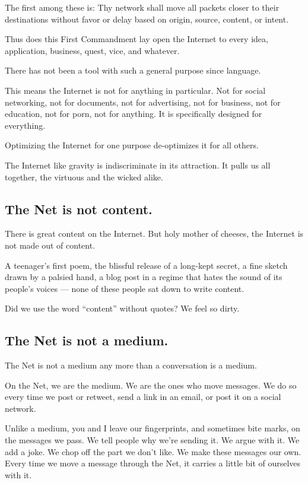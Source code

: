 \documentclass[letterpaper,12pt,english]{sphinxmanual}
\begin{document}
The first among these is: Thy network shall move all packets closer to their destinations without favor or delay based on origin, source, content, or intent.

Thus does this First Commandment lay open the Internet to every idea, application, business, quest, vice, and whatever.

There has not been a tool with such a general purpose since language.

This means the Internet is not for anything in particular. Not for social networking, not for documents, not for advertising, not for business, not for education, not for porn, not for anything. It is specifically designed for everything.

Optimizing the Internet for one purpose de-optimizes it for all others.

The Internet like gravity is indiscriminate in its attraction. It pulls us all together, the virtuous and the wicked alike.


\subsection{The Net is not content.}
\label{2015newclues:the-net-is-not-content}
There is great content on the Internet. But holy mother of cheeses, the Internet is not made out of content.

A teenager's first poem, the blissful release of a long-kept secret, a fine sketch drawn by a palsied hand, a blog post in a regime that hates the sound of its people's voices — none of these people sat down to write content.

Did we use the word ``content'' without quotes? We feel so dirty.


\subsection{The Net is not a medium.}
\label{2015newclues:the-net-is-not-a-medium}
The Net is not a medium any more than a conversation is a medium.

On the Net, we are the medium. We are the ones who move messages. We do so every time we post or retweet, send a link in an email, or post it on a social network.

Unlike a medium, you and I leave our fingerprints, and sometimes bite marks, on the messages we pass. We tell people why we're sending it. We argue with it. We add a joke. We chop off the part we don't like. We make these messages our own.
Every time we move a message through the Net, it carries a little bit of ourselves with it.
\end{document}
